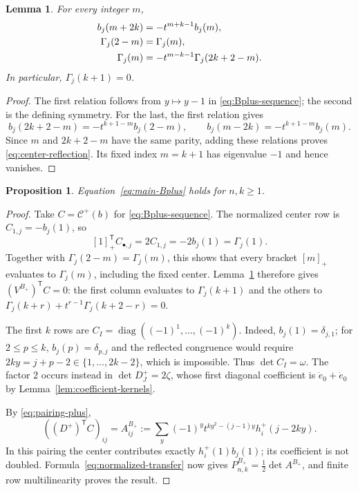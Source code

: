 \documentclass[12pt]{article}
\newtheorem{proposition}[theorem]{Proposition}
\newtheorem{lemma}[theorem]{Lemma}
\numberwithin{equation}{section}
\newcommand{\dote}{\dot e}
\newcommand{\diag}{\operatorname{diag}}
\begin{document}
\begin{lemma}\label{lem:center-reflection}
For every integer $m$,
\begin{align}
 b_j(m+2k)&=-t^{m+k-1}b_j(m),\notag\\
 \Gamma_j(2-m)&=\Gamma_j(m),\notag\\
 \Gamma_j(m)&=-t^{m-k-1}\Gamma_j(2k+2-m).
 \label{eq:center-reflection}
\end{align}
In particular, $\Gamma_j(k+1)=0$.
\end{lemma}

\begin{proof}
The first relation follows from $y\mapsto y-1$ in
\eqref{eq:Bplus-sequence}; the second is the defining symmetry.
For the last, the first relation gives
\[
 b_j(2k+2-m)=-t^{k+1-m}b_j(2-m),\qquad
 b_j(m-2k)=-t^{k+1-m}b_j(m).
\]
Since $m$ and $2k+2-m$ have the same parity, adding these relations
proves \eqref{eq:center-reflection}.  Its fixed index $m=k+1$
has eigenvalue $-1$ and hence vanishes.
\end{proof}

\begin{proposition}
Equation~\eqref{eq:main-Bplus} holds for $n,k\ge1$.
\end{proposition}

\begin{proof}
Take $C=\mathcal C^+(b)$ for \eqref{eq:Bplus-sequence}.
The normalized center row is $C_{1,j}=-b_j(1)$, so
\[
 [1]_+^{\mathsf T}C_{\bullet,j}=2C_{1,j}
 =-2b_j(1)=\Gamma_j(1).
\]
Together with $\Gamma_j(2-m)=\Gamma_j(m)$, this shows that every
bracket $[m]_+$ evaluates to $\Gamma_j(m)$, including the fixed
center.  Lemma~\ref{lem:center-reflection} therefore gives
$(V^{B_+})^{\mathsf T}C=0$: the first column evaluates to
$\Gamma_j(k+1)$ and the others to
$\Gamma_j(k+r)+t^{r-1}\Gamma_j(k+2-r)=0$.

The first $k$ rows are
$C_I=\diag((-1)^1,\ldots,(-1)^k)$.
Indeed, $b_j(1)=\delta_{j,1}$; for $2\le p\le k$,
$b_j(p)=\delta_{p,j}$ and the reflected congruence would require
$2ky=j+p-2\in\{1,\ldots,2k-2\}$, which is impossible.
Thus $\det C_I=\omega$.  The factor $2$ occurs instead in
$\det D^+_J=2\zeta$, whose first diagonal coefficient is
$\dote_0+\dote_0$ by Lemma~\ref{lem:coefficient-kernels}.

By \eqref{eq:pairing-plus},
\[
 ((D^+)^{\mathsf T}C)_{ij}
 =A^{B_+}_{ij}:=\sum_y(-1)^yt^{ky^2-(j-1)y}h_i^+(j-2ky).
\]
In this pairing the center contributes exactly $h_i^+(1)b_j(1)$;
its coefficient is not doubled.  Formula~\eqref{eq:normalized-transfer}
now gives $P^{B_+}_{n,k}=\tfrac12\det A^{B_+}$, and finite row
multilinearity proves the result.
\end{proof}
\end{document}
